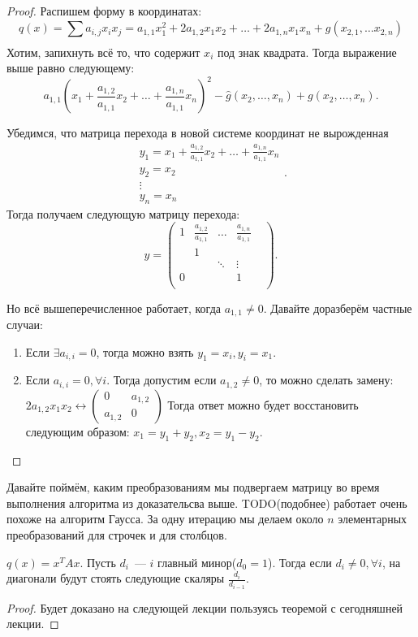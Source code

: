 \begin{proof}
    Распишем форму в координатах:
    \[
        q(x) = \sum\limits_{}^{}{a_{i,j} x_i x_j} = a_{1,1}x_1^2 + 2a_{1,2}x_1x_2 + \dots + 2a_{1,n}x_1x_n +
        g(x_{2,1},\dots x_{2,n})
    \]
    Хотим, запихнуть всё то, что содержит $x_i$ под знак квадрата.
    Тогда выражение выше равно следующему:
    \[
        a_{1,1}\left(x_1 + \frac{a_{1,2}}{a_{1,1}}x_2 + \dots + \frac{a_{1,n}}{a_{1,1}}x_n\right)^2 -
        \hat{g}(x_2,\dots, x_n) + g(x_2,\dots, x_n)
    .\]
    
    Убедимся, что матрица перехода в новой системе координат не вырожденная
     \[
         \begin{gathered}
             y_1 = x_1 + \frac{a_{1,2}}{a_{1,1}}x_2 + \dots + \frac{a_{1,n}}{a_{1,1}}x_n\\
             y_2 = x_2\\
             \vdots\\
             y_n = x_n
         \end{gathered}
    .\] 
    Тогда получаем следующую матрицу перехода:
    \[
    y = 
    \begin{pmatrix}
        1 & \frac{a_{1,2}}{a_{1,1}} & \dots & \frac{a_{1,n}}{a_{1,1}}\\
          & 1 & & &\\
          &  & \ddots &\vdots\\
          0 & & & 1\\
    \end{pmatrix}
    .\] 

    Но всё вышеперечисленное работает, когда $a_{1,1}\not= 0$.
    Давайте доразберём частные случаи:
    \begin{enumerate}
        \item
        Если $\exists a_{i,i} = 0$, тогда можно взять $y_1 = x_i, y_i = x_1$.
        \item
            Если $a_{i,i} = 0,\forall i$. Тогда допустим если $a_{1,2}\not=0$, то можно сделать замену:
        $2a_{1,2} x_1 x_2 \leftrightarrow
        \begin{pmatrix}
            0 & a_{1,2}\\
            a_{1, 2} & 0
        \end{pmatrix}$
        Тогда ответ можно будет восстановить следующим образом:
        $x_1 = y_1 + y_2, x_2 = y_1 - y_2$.
    \end{enumerate}
\end{proof}
Давайте поймём, каким преобразованиям мы подвергаем матрицу во время выполнения алгоритма из доказательсва
выше.
TODO(подобнее) работает очень похоже на алгоритм Гаусса. За одну итерацию мы делаем около $n$ элементарных
преобразований для строчек и для столбцов.
\begin{theorem}
    $q(x) = x^T Ax$. Пусть $d_i$~--- $i$ главный минор($d_0=1$). Тогда если $d_i \not= 0,\forall i$, на диагонали
    будут стоять следующие скаляры $\frac{d_i}{d_{i - 1}}$.
\end{theorem}
\begin{proof}
    Будет доказано на следующей лекции пользуясь теоремой с сегодняшней лекции.
\end{proof}
